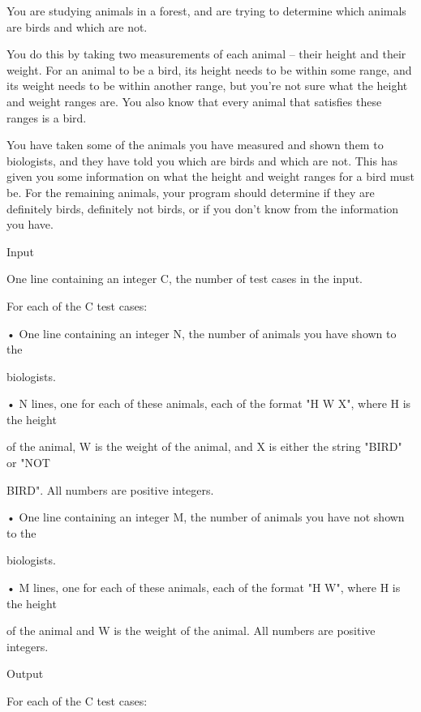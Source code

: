



   You are studying animals in a forest, and are trying to determine which animals are birds and which are not.  




   You do this by taking two measurements of each animal – their height and their weight. For an animal to be a bird, its height needs to be within some range, and its weight needs to be within another range, but you're not sure what the height and weight ranges are. You also know that every animal that satisfies these ranges is a bird.  




   You have taken some of the animals you have measured and shown them to biologists, and they have told you which are birds and which are not. This has given you some information on what the height and weight ranges for a bird must be. For the remaining animals, your program should determine if they are definitely birds, definitely not birds, or if you don't know from the information you have.  




   Input   


   One line containing an integer C, the number of test cases in the input.   


   For each of the C test cases:   


   • One line containing an integer N, the number of animals you have shown to the   


   biologists.   


   • N lines, one for each of these animals, each of the format "H W X", where H is the height   


   of the animal, W is the weight of the animal, and X is either the string "BIRD" or "NOT   


   BIRD". All numbers are positive integers.   


   • One line containing an integer M, the number of animals you have not shown to the   


   biologists.   


   • M lines, one for each of these animals, each of the format "H W", where H is the height   


   of the animal and W is the weight of the animal. All numbers are positive integers.  




   Output   


   For each of the C test cases:   


